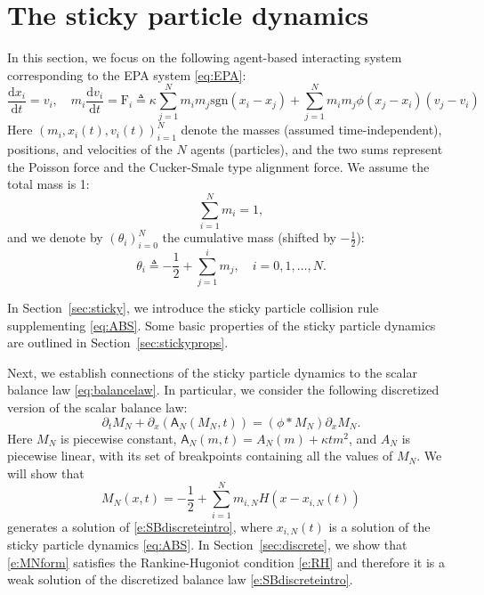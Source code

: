 \documentclass[10pt,a4paper]{amsart}
\def\dd{\mathrm{d}}
\def\pa{\partial}
\def\F{\mathrm{F}}
\def\A{\mathsf{A}}
\newcommand{\sgn}[1]{\mathrm{sgn}(#1)}
\begin{document}
	\section{The sticky particle dynamics}
	\label{sec:discbalance}
	
	In this section, we focus on the following agent-based interacting system corresponding to the EPA system \eqref{eq:EPA}:
	\begin{equation}
		\label{eq:ABS}
		\frac{\dd x_i}{\dd t} = v_i,\quad
		m_i\frac{\dd v_i}{\dd t} = \F_i \triangleq \kappa\sum_{j=1}^N m_im_j \sgn{x_i-x_j} + \sum_{j=1}^N m_im_j \phi(x_j - x_i) (v_j - v_i)
	\end{equation}
	Here $(m_i,x_i(t), v_i(t))_{i=1}^N$ denote the masses (assumed time-independent), positions, and velocities of the $N$ agents (particles), and the two sums represent the Poisson force and the Cucker-Smale type alignment force. We assume the total mass is 1:
	\[ \sum_{i=1}^N m_i = 1,\]
	and we denote by $(\theta_i)_{i=0}^N$ the cumulative mass (shifted by $-\frac12$):
	\[
	\theta_i \triangleq -\frac{1}{2}+\sum_{j=1}^i m_j,\quad i=0,1,\ldots,N.
	\]

	
	In Section~\ref{sec:sticky}, we introduce the sticky particle collision rule supplementing \eqref{eq:ABS}. Some basic properties of the sticky particle dynamics are outlined in Section~\ref{sec:stickyprops}.  
	
	Next, we establish connections of the sticky particle dynamics to the scalar balance law \eqref{eq:balancelaw}. In particular, we consider the following discretized version of the scalar balance law:
	\begin{equation}
		\label{e:SBdiscreteintro}
		\pa_t M_N + \pa_x(\A_N(M_N,t)) = (\phi\ast M_N) \pa_x M_N.
	\end{equation} 
	Here $M_N$ is piecewise constant, $\A_N(m,t) = A_N(m) + \kappa t m^2$, and $A_N$ is piecewise linear, with its set of breakpoints containing all the values of $M_N$. We will show that 
	\begin{equation} 
		\label{e:MNform}
		M_N(x,t) = -\frac12 + \sum_{i=1}^N m_{i,N} H(x - x_{i,N}(t))
	\end{equation} 
	generates a solution of \eqref{e:SBdiscreteintro}, where  $x_{i,N}(t)$ is a solution of the sticky particle dynamics \eqref{eq:ABS}. 
	In Section~\ref{sec:discrete}, we show that \eqref{e:MNform} satisfies the Rankine-Hugoniot condition \eqref{e:RH} and therefore it is a weak solution of the discretized balance law \eqref{e:SBdiscreteintro}.
	
\end{document}
